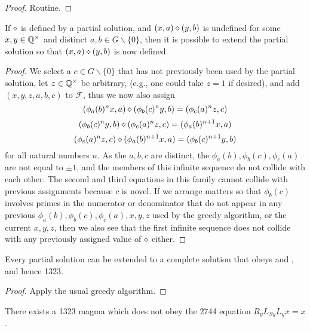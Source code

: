 \begin{proof} Routine.
\end{proof}

\begin{lemma}\label{greedy-1323}\leanok{}  If $\diamond$ is defined by a partial solution, and $(x,a) \diamond (y,b)$ is undefined for some $x,y \in \mathbb{Q}^\times$ and distinct $a,b \in G \backslash \{0\}$, then it is possible to extend the partial solution so that $(x,a) \diamond (y,b)$ is now defined.
\end{lemma}

\begin{proof} We select a $c \in G \backslash \{0\}$ that has not previously been used by the partial solution, let $z \in \mathbb{Q}^\times$ be arbitrary, (e.g., one could take $z=1$ if desired), and add $(x,y,z,a,b,c)$ to ${\mathcal F}$, thus we now also assign
$$ (\phi_a(b)^n x,a) \diamond (\phi_b(c)^n y,b) = (\phi_c(a)^n z,c)$$
$$ (\phi_b(c)^n y,b) \diamond (\phi_c(a)^n z,c) = (\phi_a(b)^{n+1} x, a)$$
$$ (\phi_c(a)^n z,c) \diamond (\phi_a(b)^{n+1} x, a) = (\phi_b(c)^{n+1} y,b)$$
for all natural numbers $n$.  As the $a,b,c$ are distinct, the $\phi_a(b), \phi_b(c), \phi_c(a)$ are not equal to $\pm 1$, and the members of this infinite sequence do not collide with each other.  The second and third equations in this family cannot collide with previous assignments because $c$ is novel.  If we arrange matters so that $\phi_b(c)$ involves primes in the numerator or denominator that do not appear in any previous $\phi_a(b), \phi_b(c), \phi_c(a), x, y, z$ used by the greedy algorithm, or the current $x,y,z$, then we also see that the first infinite sequence does not collide with any previously assigned value of $\diamond$ either.
\end{proof}

\begin{corollary}\label{greedy-iterate}\leanok{}  Every partial solution can be extended to a complete solution that obeys  and , and hence 1323.
\end{corollary}

\begin{proof} Apply the usual greedy algorithm.
\end{proof}

\begin{corollary}\label{1323-refute-2744}\leanok{}  There exists a 1323 magma which does not obey the 2744 equation $R_y L_{Sy} L_y x = x$.
\end{corollary}

